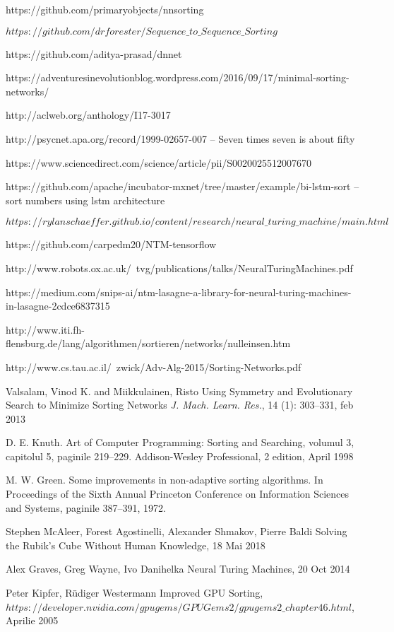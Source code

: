 \documentclass[12pt]{article}
\begin{document}
\pagebreak
\begin{thebibliography}{12}
 https://github.com/primaryobjects/nnsorting

$https://github.com/drforester/Sequence\_to\_Sequence\_Sorting$

 https://github.com/aditya-prasad/dnnet

 https://adventuresinevolutionblog.wordpress.com/2016/09/17/minimal-sorting-networks/

 http://aclweb.org/anthology/I17-3017


 http://psycnet.apa.org/record/1999-02657-007 -- Seven times seven is about fifty

 https://www.sciencedirect.com/science/article/pii/S0020025512007670

 https://github.com/apache/incubator-mxnet/tree/master/example/bi-lstm-sort -- sort numbers using lstm architecture 

 $https://rylanschaeffer.github.io/content/research/neural\_turing\_machine/main.html$

 https://github.com/carpedm20/NTM-tensorflow

 http://www.robots.ox.ac.uk/~tvg/publications/talks/NeuralTuringMachines.pdf

 https://medium.com/snips-ai/ntm-lasagne-a-library-for-neural-turing-machines-in-lasagne-2cdce6837315

 http://www.iti.fh-flensburg.de/lang/algorithmen/sortieren/networks/nulleinsen.htm

 http://www.cs.tau.ac.il/~zwick/Adv-Alg-2015/Sorting-Networks.pdf

 Valsalam, Vinod K. and Miikkulainen, Risto
 \newblock Using Symmetry and Evolutionary Search to Minimize Sorting Networks
 \newblock \emph{J. Mach. Learn. Res.}, 14 (1):  303--331, feb 2013

 D. E. Knuth. Art of Computer Programming: Sorting and Searching, volumul 3, capitolul 5, paginile
 219–229. Addison-Wesley Professional, 2 edition, April 1998

 M. W. Green. Some improvements in non-adaptive sorting algorithms. In Proceedings of the Sixth
 Annual Princeton Conference on Information Sciences and Systems, paginile 387–391, 1972.

 Stephen McAleer, Forest Agostinelli, Alexander Shmakov, Pierre Baldi
 Solving the Rubik's Cube Without Human Knowledge, 18 Mai 2018

 Alex Graves, Greg Wayne, Ivo Danihelka
 Neural Turing Machines, 20 Oct 2014
 
 \newblock Peter Kipfer, Rüdiger Westermann
 \newblock Improved GPU Sorting,
 \newblock $https://developer.nvidia.com/gpugems/GPUGems2/gpugems2\_chapter46.html$, Aprilie 2005
 


\end{thebibliography}
\end{document}
